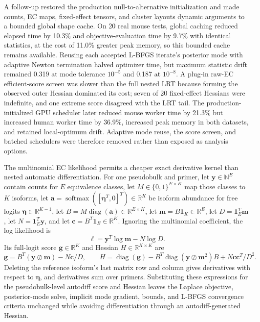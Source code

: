 \documentclass[11pt]{article}
\begin{document}
A follow-up restored the production null-to-alternative initialization and made counts, EC maps, fixed-effect tensors, and cluster layouts dynamic arguments to a bounded global shape cache. On 20 real mouse tests, global caching reduced elapsed time by 10.3\% and objective-evaluation time by 9.7\% with identical statistics, at the cost of 11.0\% greater peak memory, so this bounded cache remains available. Reusing each accepted L-BFGS iterate's posterior mode with adaptive Newton termination halved optimizer time, but maximum statistic drift remained 0.319 at mode tolerance $10^{-5}$ and 0.187 at $10^{-8}$. A plug-in raw-EC efficient-score screen was slower than the full nested LRT because forming the observed outer Hessian dominated its cost; seven of 20 fixed-effect Hessians were indefinite, and one extreme score disagreed with the LRT tail. The production-initialized GPU scheduler later reduced mouse worker time by 21.3\% but increased human worker time by 36.9\%, increased peak memory in both datasets, and retained local-optimum drift. Adaptive mode reuse, the score screen, and batched schedulers were therefore removed rather than exposed as analysis options.

The multinomial EC likelihood permits a cheaper exact derivative kernel than nested automatic differentiation. For one pseudobulk and primer, let $\bm y\in\mathbb{N}^{E}$ contain counts for $E$ equivalence classes, let $M\in\{0,1\}^{E\times K}$ map those classes to $K$ isoforms, let $\bm a=\operatorname{softmax}([\bm\eta^T,0]^T)\in\mathbb{R}^{K}$ be isoform abundance for free logits $\bm\eta\in\mathbb{R}^{K-1}$, let $B=M\operatorname{diag}(\bm a)\in\mathbb{R}^{E\times K}$, let $\bm m=B\bm 1_K\in\mathbb{R}^{E}$, let $D=\bm 1_E^T\bm m$, let $N=\bm 1_E^T\bm y$, and let $\bm c=B^T\bm 1_E\in\mathbb{R}^{K}$. Ignoring the multinomial coefficient, the log likelihood is \[\ell=\bm y^T\log\bm m-N\log D.\] Its full-logit score $\bm g\in\mathbb{R}^{K}$ and Hessian $H\in\mathbb{R}^{K\times K}$ are \[\bm g=B^T(\bm y\oslash\bm m)-N\bm c/D,\qquad H=\operatorname{diag}(\bm g)-B^T\operatorname{diag}(\bm y\oslash\bm m^2)B+N\bm c\bm c^T/D^2.\] Deleting the reference isoform's last matrix row and column gives derivatives with respect to $\bm\eta$, and derivatives sum over primers. Substituting these expressions for the pseudobulk-level autodiff score and Hessian leaves the Laplace objective, posterior-mode solve, implicit mode gradient, bounds, and L-BFGS convergence criteria unchanged while avoiding differentiation through an autodiff-generated Hessian.
\end{document}
